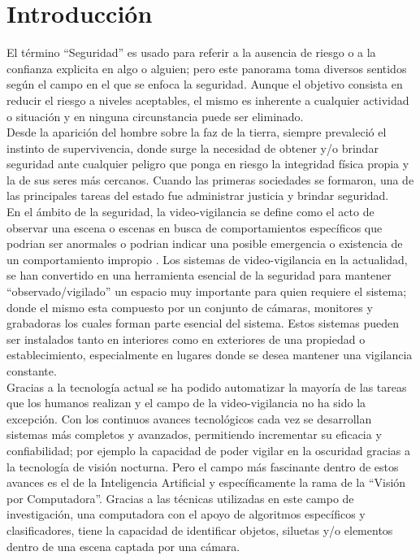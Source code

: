 \chapter{Introducción}

El término ``Seguridad'' es usado para referir a la ausencia de riesgo o a la confianza explicita en algo o alguien; pero este panorama toma diversos sentidos según el campo en el que se enfoca la seguridad. Aunque el objetivo consista en reducir el riesgo a niveles aceptables, el mismo es inherente a cualquier actividad o situación y en ninguna circunstancia puede ser eliminado.\\

Desde la aparición del hombre sobre la faz de la tierra, siempre prevaleció el instinto de supervivencia, donde surge la necesidad de obtener y/o brindar seguridad ante cualquier peligro que ponga en riesgo la integridad física propia y la de sus seres más cercanos. Cuando las primeras sociedades se formaron, una de las principales tareas del estado fue administrar justicia y brindar seguridad.\\

En el ámbito de la seguridad, la video-vigilancia se define como el acto de observar una escena o escenas en busca de comportamientos específicos que podrian ser anormales o podrian indicar una posible emergencia o existencia de un comportamiento impropio \cite{NORMAN:201795}. Los sistemas de video-vigilancia en la actualidad, se han convertido en una herramienta esencial de la seguridad para mantener ``observado/vigilado'' un espacio muy importante para quien requiere el sistema; donde el mismo esta compuesto por un conjunto de cámaras, monitores y grabadoras los cuales forman parte esencial del sistema. Estos sistemas pueden ser instalados tanto en interiores como en exteriores de una propiedad o establecimiento, especialmente en lugares donde se desea mantener una vigilancia constante.\\

Gracias a la tecnología actual se ha podido automatizar la mayoría de las tareas que los humanos realizan y el campo de la video-vigilancia no ha sido la excepción. Con los continuos avances tecnológicos cada vez se desarrollan sistemas más completos y avanzados, permitiendo incrementar su eficacia y confiabilidad; por ejemplo la capacidad de poder vigilar en la oscuridad gracias a la tecnología de visión nocturna. Pero el campo más fascinante dentro de estos avances es el de la Inteligencia Artificial y específicamente la rama de la ``Visión por Computadora''. Gracias a las técnicas utilizadas en este campo de investigación, una computadora con el apoyo de algoritmos específicos y clasificadores, tiene la capacidad de identificar objetos, siluetas y/o elementos dentro de una escena captada por una cámara.\\

